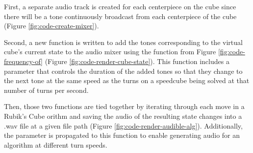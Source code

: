 First, a separate audio track is created for each centerpiece on the cube since there will be a tone continuously broadcast from each centerpiece of the cube (Figure \ref{fig:code-create-mixer}).

Second, a new function is written to add the tones corresponding to the virtual cube's current state to the audio mixer using the  function from Figure \ref{fig:code-frequency-of} (Figure \ref{fig:code-render-cube-state}).
This function includes a  parameter that controls the duration of the added tones so that they change to the next tone at the same speed as the turns on a speedcube being solved at that number of turns per second.

Then, those two functions are tied together by iterating through each move in a Rubik's Cube orithm and saving the audio of the resulting state changes into a .wav file at a given file path (Figure \ref{fig:code-render-audible-alg}).
Additionally, the  parameter is propagated to this function to enable generating audio for an algorithm at different turn speeds.

